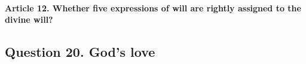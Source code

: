 \documentclass{ucetd}
\begin{document}
\paragraph{Article 12. Whether five expressions of will are rightly assigned to the divine will?}
\subsection{Question 20. God's love}
\end{document}
